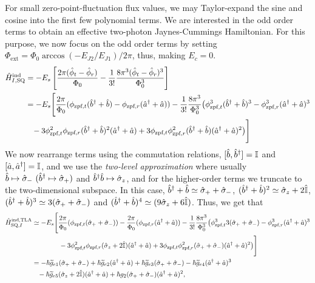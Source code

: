 For small zero-point-fluctuation flux values, we may Taylor-expand the sine and cosine into the first few polynomial terms. We are interested in the odd order terms to obtain an effective two-photon Jaynes-Cummings Hamiltonian. For this purpose, we now focus on the odd order terms by setting $\Phi_{\text{ext}}=\Phi_0 \arccos(-E_{J2}/E_{J1})/2\pi$, thus, making $E_c=0$.
\begin{align}
    \hat{H}_{I,\text{SQ}}^{\text{ind}}&=-E_{s}\left[\frac{2\pi(\hat{\phi}_t-\hat{\phi}_r)}{\Phi_0} -\frac{1}{3!}\frac{8\pi^3 (\hat{\phi}_t-\hat{\phi}_r)^3}{\Phi_0^3}\right]\nonumber\\ &= -E_{s}\Bigg[ \frac{2\pi}{\Phi_0}(\phi_{\text{zpf},t}(\hat{b}^\dagger+\hat{b} ) -\phi_{\text{zpf},r}(\hat{a}^\dagger +\hat{a}) )-\frac{1}{3!}\frac{8\pi^3}{\Phi_0^3}\big(\phi_{\text{zpf},t}^{3} (\hat{b}^\dagger+\hat{b})^3-\phi_{\text{zpf},r}^{3} (\hat{a}^\dagger +\hat{a})^3 \nonumber\\&\,\,\,\,\,-3\phi_{\text{zpf},t}^2\phi_{\text{zpf},r}(\hat{b}^\dagger+\hat{b})^2(\hat{a}^\dagger + \hat{a}) + 3\phi_{\text{zpf},t}\phi_{\text{zpf},r}^2(\hat{b}^\dagger +\hat{b})(\hat{a}^\dagger +\hat{a})^2 \big)   \Bigg]
\end{align}
We now rearrange terms using the commutation relations, $[\hat{b},\hat{b}^\dagger]=\mathbb{I}$ and $[\hat{a},\hat{a}^\dagger]=\mathbb{I}$, and we use the \textit{two-level approximation} where usually $\hat{b}\mapsto\hat{\sigma}_-\,\,(\hat{b}^\dagger\mapsto\hat{\sigma}_+)$ and $\hat{b}^\dagger\hat{b}\mapsto\hat{\sigma}_z$, and for the higher-order terms we truncate to the two-dimensional subspace. In this case, $\hat{b}^\dagger+\hat{b}\simeq \hat{\sigma}_++\hat{\sigma}_-$, $(\hat{b}^\dagger+\hat{b})^2\simeq \hat{\sigma}_z +2\hat{\mathbb{I}}$, $(\hat{b}^\dagger+\hat{b})^3\simeq3(\hat{\sigma}_++\hat{\sigma}_-)$ and $(\hat{b}^\dagger+\hat{b})^4\simeq(9\hat{\sigma}_z+6\hat{\mathbb{I}})$. Thus, we get that
\begin{align}
    \hat{H}_{\text{SQ},I}^{\text{ind,TLA}}&\simeq -E_s\Bigg[\frac{2\pi}{\Phi_0}(\phi_{\text{zpf},t}(\hat{\sigma}_++\hat{\sigma}_- ))- \frac{2\pi}{\Phi_0}(\phi_{\text{zpf},r}(\hat{a}^\dagger+\hat{a} ))-\frac{1}{3!}\frac{8\pi^3}{\Phi_0^3}\big(\phi_{\text{zpf},t}^3 3(\hat{\sigma}_+ +\hat{\sigma}_-) -\phi_{\text{zpf},r}^3 (\hat{a}^\dagger +\hat{a})^3 \nonumber\\ &\,\,\,\,\,\,\,\,\,\,\,\,\,\,\,\,\,\,\,\,\,\,\,\,-3\phi_{\text{zpf},t}^2\phi_{\text{zpf},r}(\hat{\sigma}_z +2\hat{\mathbb{I}})(\hat{a}^\dagger +\hat{a}) + 3\phi_{\text{zpf},t}\phi_{\text{zpf},r}^2(\hat{\sigma}_+ +\hat{\sigma}_-)(\hat{a}^\dagger+\hat{a})^2\big)\Bigg]\nonumber\\ &= -\hbar \widetilde{g}_{e1}(\hat{\sigma}_+ + \hat{\sigma}_-) + \hbar \widetilde{g}_{e2}(\hat{a}^\dagger +\hat{a})+ \hbar \widetilde{g}_{e3}(\hat{\sigma}_+ + \hat{\sigma}_-) - \hbar \widetilde{g}_{e4}(\hat{a}^\dagger + \hat{a})^3 \nonumber\\&\,\,\,\,\, - \hbar \widetilde{g}_{e5}(\hat{\sigma}_z+2\hat{\mathbb{I}})(\hat{a}^\dagger + \hat{a}) + \hbar g_{2} (\hat{\sigma}_+ + \hat{\sigma}_-)(\hat{a}^\dagger+ \hat{a})^2,
\end{align}

